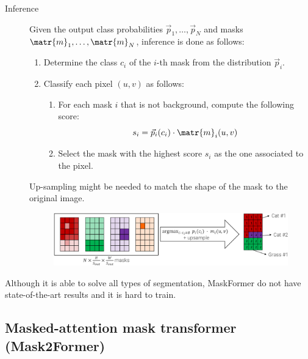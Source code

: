 \begin{description}
\begin{description}
            \item[Inference]
                Given the output class probabilities $\vec{p}_1, \dots, \vec{p}_N$ and masks $\matr{m}_1, \dots, \matr{m}_N$, inference is done as follows:
                \begin{enumerate}
                    \item Determine the class $c_i$ of the $i$-th mask from the distribution $\vec{p}_i$.
                    \item Classify each pixel $(u, v)$ as follows:
                    \begin{enumerate}
                        \item For each mask $i$ that is not background, compute the following score:
                        \[ s_i = \vec{p}_i(c_i) \cdot \matr{m}_i(u, v) \]
                        \item Select the mask with the highest score $s_i$ as the one associated to the pixel.
                    \end{enumerate}
                \end{enumerate}

                \begin{remark}
                    Up-sampling might be needed to match the shape of the mask to the original image.
                \end{remark}

                \begin{figure}[H]
                    \centering
                    \includegraphics[width=0.8\linewidth]{./img/_maskformer_inference.pdf}
                \end{figure}
        \end{description}

    \begin{remark}
        Although it is able to solve all types of segmentation, MaskFormer do not have state-of-the-art results and it is hard to train.
    \end{remark}
\end{description}


\subsection{Masked-attention mask transformer (Mask2Former)}

